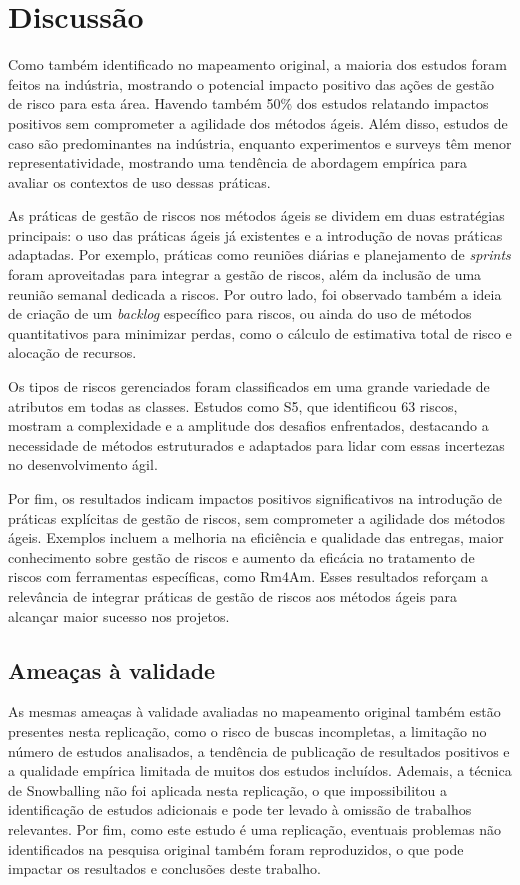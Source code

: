 \documentclass[
	12pt,
	openright,
	twoside,
	a4paper,
	english,
	brazil
	]{abntex2}
\begin{document}
\section{Discussão}

Como também identificado no mapeamento original, a maioria dos estudos foram feitos na indústria, mostrando o potencial impacto positivo das ações de gestão de risco para esta área. Havendo também 50\% dos estudos relatando impactos positivos sem comprometer a agilidade dos métodos ágeis. Além disso, estudos de caso são predominantes na indústria, enquanto experimentos e surveys têm menor representatividade, mostrando uma tendência de abordagem empírica para avaliar os contextos de uso dessas práticas.

As práticas de gestão de riscos nos métodos ágeis se dividem em duas estratégias principais: o uso das práticas ágeis já existentes e a introdução de novas práticas adaptadas. Por exemplo, práticas como reuniões diárias e planejamento de \textit{sprints} foram aproveitadas para integrar a gestão de riscos, além da inclusão de uma reunião semanal dedicada a riscos. Por outro lado, foi observado também a ideia de criação de um \textit{backlog} específico para riscos, ou ainda do uso de métodos quantitativos para minimizar perdas, como o cálculo de estimativa total de risco e alocação de recursos.

Os tipos de riscos gerenciados foram classificados em uma grande variedade de atributos em todas as classes. Estudos como S5, que identificou 63 riscos, mostram a complexidade e a amplitude dos desafios enfrentados, destacando a necessidade de métodos estruturados e adaptados para lidar com essas incertezas no desenvolvimento ágil.

Por fim, os resultados indicam impactos positivos significativos na introdução de práticas explícitas de gestão de riscos, sem comprometer a agilidade dos métodos ágeis. Exemplos incluem a melhoria na eficiência e qualidade das entregas, maior conhecimento sobre gestão de riscos e aumento da eficácia no tratamento de riscos com ferramentas específicas, como Rm4Am. Esses resultados reforçam a relevância de integrar práticas de gestão de riscos aos métodos ágeis para alcançar maior sucesso nos projetos.


\subsection{Ameaças à validade}

As mesmas ameaças à validade avaliadas no mapeamento original também estão presentes nesta replicação, como o risco de buscas incompletas, a limitação no número de estudos analisados, a tendência de publicação de resultados positivos e a qualidade empírica limitada de muitos dos estudos incluídos. Ademais, a técnica de Snowballing não foi aplicada nesta replicação, o que impossibilitou a identificação de estudos adicionais e pode ter levado à omissão de trabalhos relevantes. Por fim, como este estudo é uma replicação, eventuais problemas não identificados na pesquisa original também foram reproduzidos, o que pode impactar os resultados e conclusões deste trabalho.
\end{document}
